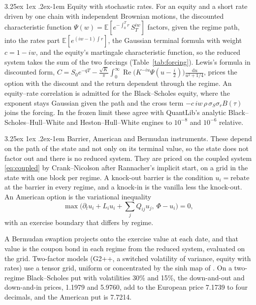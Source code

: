 \documentclass[11pt]{article}
\makeatletter
\renewcommand\paragraph{\@startsection{paragraph}{4}{\z@}%
  {3.25ex \@plus1ex \@minus.2ex}{-1em}%
  {\normalfont\normalsize\itshape}}
\theoremstyle{remark}
\newcommand{\E}{\mathbb{E}}
\newcommand{\dd}{\,\mathrm{d}}
\newcommand{\ql}{\textsf{QuantLib}}
\makeatother
\begin{document}
\paragraph{Equity with stochastic rates.}
For an equity and a short rate driven by one chain with independent Brownian motions, the discounted
characteristic function $\Psi(w) = \E[e^{-\int_0^T r}\,S_T^{iw}]$ factors, given the regime path, into the rates
part $\E[e^{(iw - 1)\int r}]$, the Gaussian terminal formula with weight $c = 1 - iw$, and the equity's
martingale characteristic function, so the reduced system takes the sum of the two forcings
(Table~\ref{tab:forcing}). Lewis's formula in discounted form,
$C = S_0e^{-qT} - \frac{\sqrt K}{\pi}\int_0^\infty \operatorname{Re}\big(K^{-iu}\Psi(u - \tfrac i2)\big)\frac{\dd u}{u^2 + 1/4}$,
prices the option with the discount and the return dependent through the regime. An equity--rate correlation is
admitted for the Black--Scholes equity, where the exponent stays Gaussian given the path and the cross term
$-c\,iw\,\rho\,\sigma_S\sigma_r B(\tau)$ joins the forcing. In the frozen limit these agree with \ql{}'s analytic
Black--Scholes--Hull--White and Heston--Hull--White engines to $10^{-8}$ and $10^{-6}$ relative.

\paragraph{Barrier, American and Bermudan instruments.}
These depend on the path of the state and not only on its terminal value, so the state does not factor out and
there is no reduced system. They are priced on the coupled system \eqref{eq:coupled} by Crank--Nicolson after
Rannacher's implicit start, on a grid in the state with one block per regime. A knock-out barrier is the
condition $u_i = \text{rebate}$ at the barrier in every regime, and a knock-in is the vanilla less the
knock-out. An American option is the variational inequality
\begin{equation}
  \max\Big(\partial_t u_i + L_i u_i + \sum_j Q_{ij}u_j,\ \Phi - u_i\Big) = 0,
  \label{eq:american}
\end{equation}
with an exercise boundary that differs by regime.

A Bermudan swaption projects onto the exercise value at each date, and that value is the coupon bond in each
regime from the reduced system, evaluated on the grid. Two-factor models (G2++, a switched volatility of
variance, equity with rates) use a tensor grid, uniform or concentrated by the sinh map of \citet{tavella2000}.
On a two-regime Black--Scholes put with volatilities 30\% and 15\%, the down-and-out and down-and-in prices,
1.1979 and 5.9760, add to the European price 7.1739 to four decimals, and the American put is 7.7214.
\end{document}
